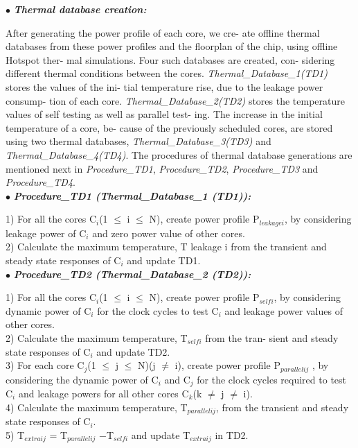 \documentclass[conference]{IEEEtran}
\begin{document}
$\bullet$ \hspace{1 cm} \textbf{\textit{Thermal database creation:}}

	\par
	After generating the power profile of each core, we cre-
ate offline thermal databases from these power profiles
and the floorplan of the chip, using offline Hotspot ther-
mal simulations. Four such databases are created, con-
sidering different thermal conditions between the cores.
\textit{Thermal\_Database\_1(TD1)} stores the values of the ini-
tial temperature rise, due to the leakage power consump-
tion of each core. \textit{Thermal\_Database\_2(TD2)} stores the
temperature values of self testing as well as parallel test-
ing. The increase in the initial temperature of a core, be-
cause of the previously scheduled cores, are stored using
two thermal databases, \textit{Thermal\_Database\_3(TD3)} and
\textit{Thermal\_Database\_4(TD4)}. The procedures of thermal
database generations are mentioned next in \textit{Procedure\_TD1},
\textit{Procedure\_TD2}, \textit{Procedure\_TD3} and \textit{Procedure\_TD4}.\\

$\bullet$ \textbf{\textit{Procedure\_TD1 (Thermal\_Database\_1 (TD1)):}}

	\par
	1) For all the cores C$_{i}$(1 $\leq$ i $\leq$ N), create power profile
P$_{leakagei}$, by considering leakage power of C$_{i}$ and zero
power value of other cores.\\
\hspace*{.33 cm}2) Calculate the maximum temperature, T leakage i from the
transient and steady state responses of C$_{i}$ and update TD1.\\


$\bullet$ \textbf{\textit{Procedure\_TD2 (Thermal\_Database\_2 (TD2)):}}

	\par
	1) For all the cores C$_{i}$(1 $\leq$ i $\leq$ N), create power profile
P$_{selfi}$, by considering dynamic power of C$_{i}$ for the clock
cycles to test C$_{i}$ and leakage power values of other cores.\\
\hspace*{.33 cm}2) Calculate the maximum temperature, T$_{selfi}$ from the tran-
sient and steady state responses of C$_{i}$ and update TD2.\\
\hspace*{.33 cm}3) For each core C$_{j}$(1 $\leq$ j $\leq$ N)(j $\neq$ i), create power profile
P$_{parallelij}$ , by considering the dynamic power of C$_{i}$ and C$_{j}$
for the clock cycles required to test C$_{i}$ and leakage powers
for all other cores C$_{k}$(k $\neq$ j $\neq$ i).\\
\hspace*{.33 cm}4) Calculate the maximum temperature, T$_{parallelij}$, from the
transient and steady state responses of C$_{i}$.\\
\hspace*{.33 cm}5) T$_{extraij}$ = T$_{parallelij}$ −T$_{selfi}$ and update T$_{extraij}$ in TD2.\\
\end{document}

